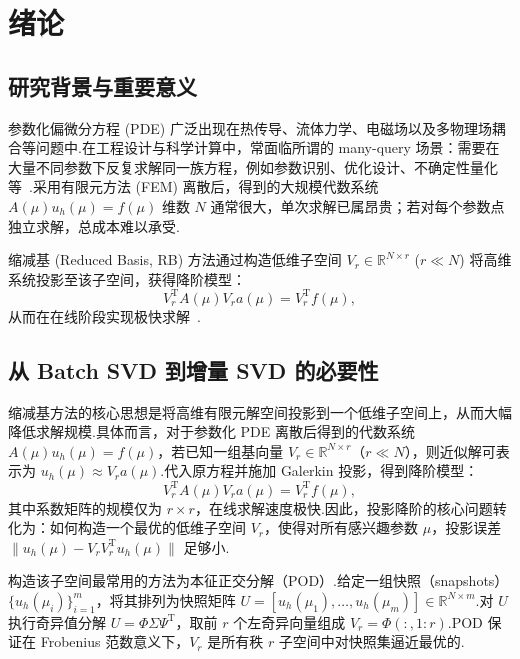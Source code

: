 
\section{绪论}

\subsection{研究背景与重要意义}
参数化偏微分方程 (PDE) 广泛出现在热传导、流体力学、电磁场以及多物理场耦合等问题中.在工程设计与科学计算中，常面临所谓的 many-query 场景：需要在大量不同参数下反复求解同一族方程，例如参数识别、优化设计、不确定性量化等~\cite{hesthaven2015,patera_rozza}.采用有限元方法 (FEM) 离散后，得到的大规模代数系统 $A(\mu)u_h(\mu)=f(\mu)$ 维数 $N$ 通常很大，单次求解已属昂贵；若对每个参数点独立求解，总成本难以承受.

缩减基 (Reduced Basis, RB) 方法通过构造低维子空间 $V_r\in\mathbb{R}^{N\times r}$ ($r\ll N$) 将高维系统投影至该子空间，获得降阶模型：
\begin{equation}
V_r^{\mathrm T} A(\mu) V_r a(\mu)=V_r^{\mathrm T} f(\mu),
\label{eq:rb}
\end{equation}
从而在在线阶段实现极快求解~\cite{hesthaven2015}.

\subsection{从 Batch SVD 到增量 SVD 的必要性}

缩减基方法的核心思想是将高维有限元解空间投影到一个低维子空间上，从而大幅降低求解规模.具体而言，对于参数化 PDE 离散后得到的代数系统 \(A(\mu)u_h(\mu)=f(\mu)\)，若已知一组基向量 \(V_r\in\mathbb{R}^{N\times r}\)（\(r\ll N\)），则近似解可表示为 \(u_h(\mu)\approx V_r a(\mu)\).代入原方程并施加 Galerkin 投影，得到降阶模型：
\begin{equation}
V_r^{\mathrm T} A(\mu) V_r a(\mu)=V_r^{\mathrm T} f(\mu),
\label{eq:rom}
\end{equation}
其中系数矩阵的规模仅为 \(r\times r\)，在线求解速度极快.因此，投影降阶的核心问题转化为：如何构造一个最优的低维子空间 \(V_r\)，使得对所有感兴趣参数 \(\mu\)，投影误差 \(\|u_h(\mu)-V_r V_r^{\mathrm T}u_h(\mu)\|\) 足够小.

构造该子空间最常用的方法为本征正交分解（POD）.给定一组快照（snapshots）\(\{u_h(\mu_i)\}_{i=1}^m\)，将其排列为快照矩阵 \(U=[u_h(\mu_1),\dots,u_h(\mu_m)]\in\mathbb{R}^{N\times m}\).对 \(U\) 执行奇异值分解 \(U=\Phi\Sigma\Psi^{\mathrm T}\)，取前 \(r\) 个左奇异向量组成 \(V_r=\Phi(:,1:r)\).POD 保证在 Frobenius 范数意义下，\(V_r\) 是所有秩 \(r\) 子空间中对快照集逼近最优的.

